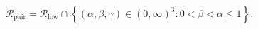 \[
\mathcal R_{\mathrm{pair}}
=\mathcal R_{\mathrm{low}}\cap
\left\{(\alpha,\beta,\gamma)\in(0,\infty)^3:
0<\beta<\alpha\leq 1\right\}.
\]